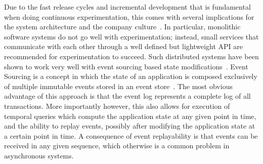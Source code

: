 Due to the fast release cycles and incremental development that is fundamental when doing continuous experimentation, this comes with several implications for the system architecture and the company culture~\cite{Lindgren2015,Olsson2012}.
In particular, monolithic software systems do not go well with experimentation; instead, small services that communicate with each other through a well defined but lightweight API are recommended for experimentation to succeed.
Such distributed systems have been shown to work very well with event sourcing based state modifications~\cite{???}.
Event Sourcing is a concept in which the state of an application is composed exclusively of multiple immutable events stored in an event store~\cite{WEB:Fowler:2005}.
The most obvious advantage of this approach is that the event log represents a complete log of all transactions.
More importantly however, this also allows for execution of temporal queries which compute the application state at any given point in time, and the ability to replay events, possibly after modifying the application state at a certain point in time.
A consequence of event replayability is that events can be received in any given sequence, which otherwise is a common problem in asynchronous systems.

